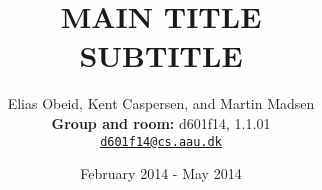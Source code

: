 


\title{MAIN TITLE \\ SUBTITLE }

\author{Elias Obeid, Kent Caspersen, and Martin Madsen \\ \textbf{Group and room:} d601f14, 1.1.01\\ \href{mailto:d601f14@cs.aau.dk}{\texttt{d601f14@cs.aau.dk}}}

\date{February 2014 - May 2014}



\frontmatter
\maketitle
\pagebreak
\mainmatter




